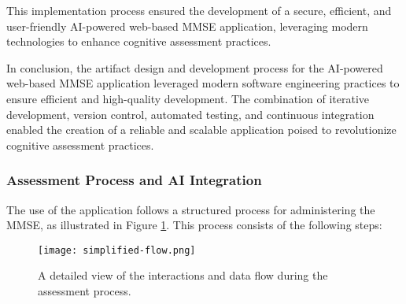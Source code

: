 This implementation process ensured the development of a secure, efficient, and user-friendly AI-powered web-based MMSE application, leveraging modern technologies to enhance cognitive assessment practices.

In conclusion, the artifact design and development process for the AI-powered web-based MMSE application leveraged modern software engineering practices to ensure efficient and high-quality development. The combination of iterative development, version control, automated testing, and continuous integration enabled the creation of a reliable and scalable application poised to revolutionize cognitive assessment practices.

\subsubsection{Assessment Process and AI Integration}

The use of the application follows a structured process for administering the MMSE, as illustrated in Figure \ref{fig:assessment-flow}. This process consists of the following steps:

\begin{figure}[h!]
\begin{center}
\texttt{[image: simplified-flow.png]}
\caption{A detailed view of the interactions and data flow during the assessment process.}
\label{fig:assessment-flow}
\end{center}
\end{figure}

